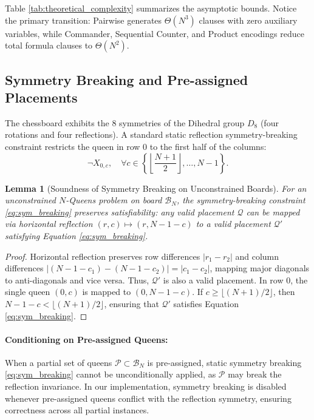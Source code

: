 \documentclass[a4paper,fleqn]{cas-sc}
\newtheorem{lemma}{Lemma}
\begin{document}
Table \ref{tab:theoretical_complexity} summarizes the asymptotic bounds. Notice the primary transition: Pairwise generates $\Theta(N^3)$ clauses with zero auxiliary variables, while Commander, Sequential Counter, and Product encodings reduce total formula clauses to $\Theta(N^2)$.

\subsection{Symmetry Breaking and Pre-assigned Placements}
The chessboard exhibits the 8 symmetries of the Dihedral group $D_8$ (four rotations and four reflections). A standard static reflection symmetry-breaking constraint restricts the queen in row 0 to the first half of the columns:
\begin{equation}
    \neg X_{0, c}, \quad \forall c \in \left\{\left\lfloor \frac{N+1}{2} \right\rfloor, \dots, N-1\right\}. \label{eq:sym_breaking}
\end{equation}

\begin{lemma}[Soundness of Symmetry Breaking on Unconstrained Boards]
For an unconstrained $N$-Queens problem on board $\mathcal{B}_N$, the symmetry-breaking constraint \eqref{eq:sym_breaking} preserves satisfiability: any valid placement $\mathcal{Q}$ can be mapped via horizontal reflection $(r, c) \mapsto (r, N - 1 - c)$ to a valid placement $\mathcal{Q}'$ satisfying Equation \eqref{eq:sym_breaking}.
\end{lemma}
\begin{proof}
Horizontal reflection preserves row differences $|r_1 - r_2|$ and column differences $|(N - 1 - c_1) - (N - 1 - c_2)| = |c_1 - c_2|$, mapping major diagonals to anti-diagonals and vice versa. Thus, $\mathcal{Q}'$ is also a valid placement. In row 0, the single queen $(0, c)$ is mapped to $(0, N - 1 - c)$. If $c \ge \lfloor (N+1)/2 \rfloor$, then $N - 1 - c < \lfloor (N+1)/2 \rfloor$, ensuring that $\mathcal{Q}'$ satisfies Equation \eqref{eq:sym_breaking}.
\end{proof}

\paragraph{Conditioning on Pre-assigned Queens:}
When a partial set of queens $\mathcal{P} \subset \mathcal{B}_N$ is pre-assigned, static symmetry breaking \eqref{eq:sym_breaking} cannot be unconditionally applied, as $\mathcal{P}$ may break the reflection invariance. In our implementation, symmetry breaking is disabled whenever pre-assigned queens conflict with the reflection symmetry, ensuring correctness across all partial instances.
\end{document}
